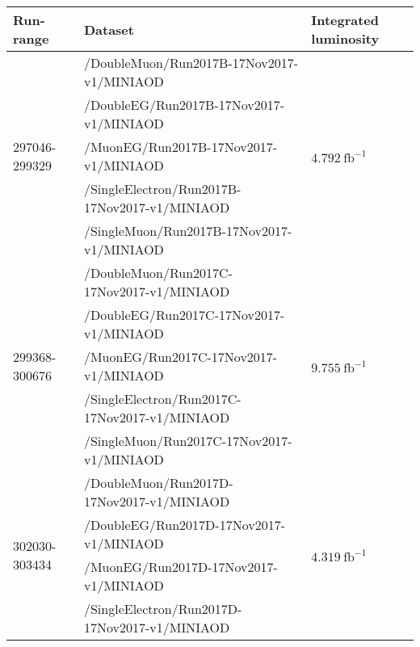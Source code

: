 \begin{table}[h]
\scriptsize
    \centering
    \begin{tabular}{|l|l|l|}
\hline %
\hline %
Run-range & Dataset & Integrated luminosity \\
\hline %
\hline %
\multirow{5}{*}{297046-299329} & /DoubleMuon/Run2017B-17Nov2017-v1/MINIAOD &  \multirow{5}{*}{$4.792\ \text{fb}^{-1}$} \\
& /DoubleEG/Run2017B-17Nov2017-v1/MINIAOD &  \\
& /MuonEG/Run2017B-17Nov2017-v1/MINIAOD &  \\
& /SingleElectron/Run2017B-17Nov2017-v1/MINIAOD &  \\
& /SingleMuon/Run2017B-17Nov2017-v1/MINIAOD &  \\
\hline
\multirow{5}{*}{299368-300676} & /DoubleMuon/Run2017C-17Nov2017-v1/MINIAOD &  \multirow{5}{*}{$9.755\ \text{fb}^{-1}$}  \\
& /DoubleEG/Run2017C-17Nov2017-v1/MINIAOD &  \\
& /MuonEG/Run2017C-17Nov2017-v1/MINIAOD &  \\
& /SingleElectron/Run2017C-17Nov2017-v1/MINIAOD &  \\
& /SingleMuon/Run2017C-17Nov2017-v1/MINIAOD &  \\
\hline
\multirow{5}{*}{302030-303434} & /DoubleMuon/Run2017D-17Nov2017-v1/MINIAOD &  \multirow{5}{*}{$4.319\ \text{fb}^{-1}$} \\
& /DoubleEG/Run2017D-17Nov2017-v1/MINIAOD &  \\
& /MuonEG/Run2017D-17Nov2017-v1/MINIAOD &  \\
& /SingleElectron/Run2017D-17Nov2017-v1/MINIAOD &  \\

\end{tabular}
\end{table}
